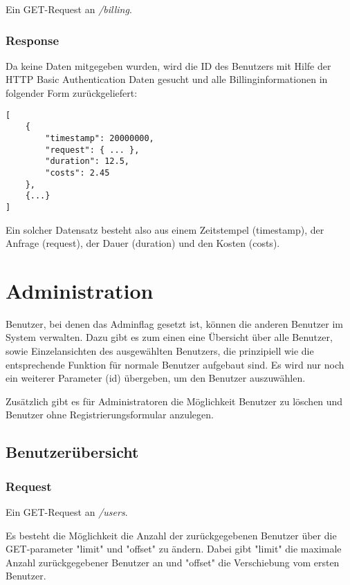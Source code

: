 \documentclass[ngerman]{scrartcl}
\begin{document}
		Ein GET-Request an \textit{/billing}.
		
		\subsubsection*{Response}
		
		Da keine Daten mitgegeben wurden, wird die ID des Benutzers mit Hilfe der HTTP Basic Authentication Daten gesucht und alle Billinginformationen in folgender Form zurückgeliefert:
		
		\begin{lstlisting}
[
	{
		"timestamp": 20000000,
		"request": { ... },
		"duration": 12.5,
		"costs": 2.45
	},
	{...}
]
		\end{lstlisting}
		
		Ein solcher Datensatz besteht also aus einem Zeitstempel (timestamp), der Anfrage (request), der Dauer (duration) und den Kosten (costs).
	

\section{Administration}

Benutzer, bei denen das Adminflag gesetzt ist, können die anderen Benutzer im System verwalten. 
Dazu gibt es zum einen eine Übersicht über alle Benutzer, sowie Einzelansichten des ausgewählten Benutzers, die prinzipiell wie die entsprechende Funktion für normale Benutzer aufgebaut sind.
Es wird nur noch ein weiterer Parameter (id) übergeben, um den Benutzer auszuwählen.

Zusätzlich gibt es für Administratoren die Möglichkeit Benutzer zu löschen und Benutzer ohne Registrierungsformular anzulegen.

	\subsection{Benutzerübersicht}
	
		\subsubsection*{Request}
		
		Ein GET-Request an \textit{/users}.
		
		Es besteht die Möglichkeit die Anzahl der zurückgegebenen Benutzer über die GET-parameter "limit" und "offset" zu ändern. Dabei gibt "limit" die maximale Anzahl zurückgegebener Benutzer an und "offset" die Verschiebung vom ersten Benutzer.
		
\end{document}
